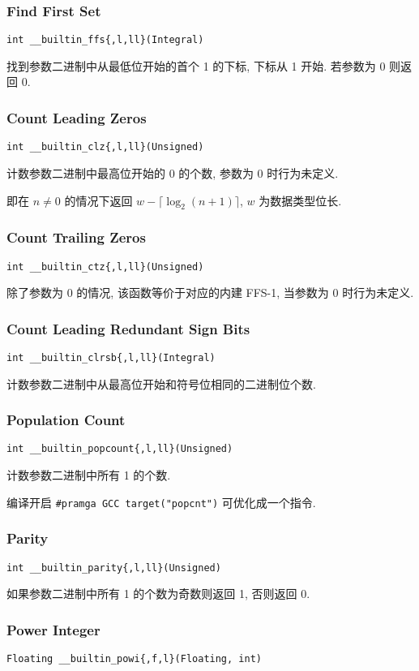 \subsubsection{Find First Set}
\lstinline|int __builtin_ffs{,l,ll}(Integral)|

找到参数二进制中从最低位开始的首个 1 的下标, 下标从 1 开始. 若参数为 0 则返回 0.

\subsubsection{Count Leading Zeros}
\lstinline|int __builtin_clz{,l,ll}(Unsigned)|

计数参数二进制中最高位开始的 0 的个数, 参数为 0 时行为未定义.

即在 $n\neq0$ 的情况下返回 $w-\lceil\log_2(n+1)\rceil$, $w$ 为数据类型位长.

\subsubsection{Count Trailing Zeros}
\lstinline|int __builtin_ctz{,l,ll}(Unsigned)|

除了参数为 0 的情况, 该函数等价于对应的内建 FFS-1, 当参数为 0 时行为未定义.

\subsubsection{Count Leading Redundant Sign Bits}
\lstinline|int __builtin_clrsb{,l,ll}(Integral)|

计数参数二进制中从最高位开始和符号位相同的二进制位个数.

\subsubsection{Population Count}
\lstinline|int __builtin_popcount{,l,ll}(Unsigned)|

计数参数二进制中所有 1 的个数.

编译开启 \lstinline{#pramga GCC target("popcnt")} 可优化成一个指令.

\subsubsection{Parity}
\lstinline|int __builtin_parity{,l,ll}(Unsigned)|

如果参数二进制中所有 1 的个数为奇数则返回 1, 否则返回 0.

\subsubsection{Power Integer}
\lstinline|Floating __builtin_powi{,f,l}(Floating, int)|

